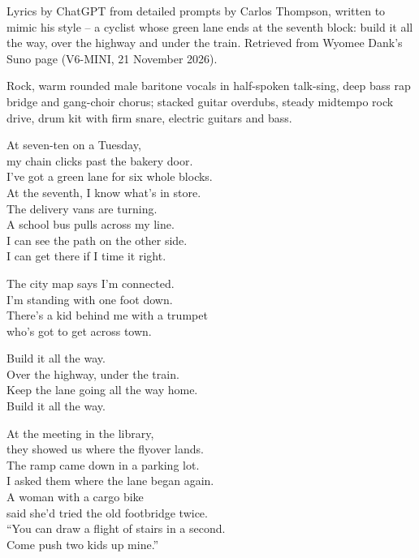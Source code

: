 
\begin{notes}
Lyrics by ChatGPT from detailed prompts by Carlos Thompson, written to mimic his style -- a cyclist whose green lane ends at the seventh block: build it all the way, over the highway and under the train. Retrieved from Wyomee Dank's Suno page (V6-MINI, 21 November 2026).
\end{notes}
\begin{style}
Rock, warm rounded male baritone vocals in half-spoken talk-sing, deep bass rap bridge and gang-choir chorus; stacked guitar overdubs, steady midtempo rock drive, drum kit with firm snare, electric guitars and bass.
\end{style}
\begin{lyrics}
At seven-ten on a Tuesday,\\
my chain clicks past the bakery door.\\
I’ve got a green lane for six whole blocks.\\
At the seventh, I know what’s in store.\\
The delivery vans are turning.\\
A school bus pulls across my line.\\
I can see the path on the other side.\\
I can get there if I time it right.

The city map says I’m connected.\\
I’m standing with one foot down.\\
There’s a kid behind me with a trumpet\\
who’s got to get across town.

Build it all the way.\\
Over the highway, under the train.\\
Keep the lane going all the way home.\\
Build it all the way.

At the meeting in the library,\\
they showed us where the flyover lands.\\
The ramp came down in a parking lot.\\
I asked them where the lane began again.\\
A woman with a cargo bike\\
said she’d tried the old footbridge twice.\\
“You can draw a flight of stairs in a second.\\
Come push two kids up mine.”


\end{lyrics}
